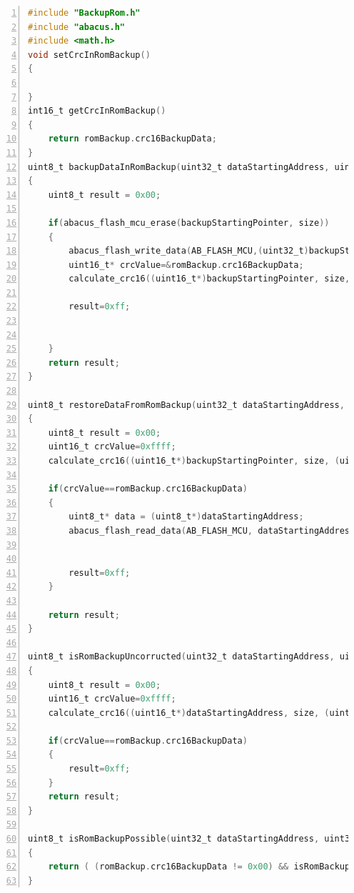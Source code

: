 \documentclass[LaM,binding=0.6cm,oneside]{../sapthesis}
\begin{document}
\begin{lstlisting}[language=C,
                   basicstyle=\scriptsize,
                   numbers=left,
                   stepnumber=0,
                   numbersep=4pt,
                   tabsize=2,
                   showspaces=false,
                   showstringspaces=false]
#include "BackupRom.h"
#include "abacus.h"
#include <math.h>
void setCrcInRomBackup()
{

}
int16_t getCrcInRomBackup()
{
    return romBackup.crc16BackupData;
}
uint8_t backupDataInRomBackup(uint32_t dataStartingAddress, uint32_t backupStartingPointer, uint32_t size)
{
    uint8_t result = 0x00;

    if(abacus_flash_mcu_erase(backupStartingPointer, size))
    {
        abacus_flash_write_data(AB_FLASH_MCU,(uint32_t)backupStartingPointer,(uint8_t*)dataStartingAddress,size);
        uint16_t* crcValue=&romBackup.crc16BackupData;
        calculate_crc16((uint16_t*)backupStartingPointer, size, crcValue, 1);

        result=0xff;


    }
    return result;
}

uint8_t restoreDataFromRomBackup(uint32_t dataStartingAddress, uint32_t backupStartingPointer, uint32_t size)
{
    uint8_t result = 0x00;
    uint16_t crcValue=0xffff;
    calculate_crc16((uint16_t*)backupStartingPointer, size, (uint16_t*)&crcValue, 1);

    if(crcValue==romBackup.crc16BackupData)
    {
        uint8_t* data = (uint8_t*)dataStartingAddress;
        abacus_flash_read_data(AB_FLASH_MCU, dataStartingAddress, data, PERSISTENT_RAM_LENGTH);


        result=0xff;
    }

    return result;
}

uint8_t isRomBackupUncorructed(uint32_t dataStartingAddress, uint32_t size)
{
    uint8_t result = 0x00;
    uint16_t crcValue=0xffff;
    calculate_crc16((uint16_t*)dataStartingAddress, size, (uint16_t*)&crcValue, 1);

    if(crcValue==romBackup.crc16BackupData)
    {
        result=0xff;
    }
    return result;
}

uint8_t isRomBackupPossible(uint32_t dataStartingAddress, uint32_t size)
{
    return ( (romBackup.crc16BackupData != 0x00) && isRomBackupUncorructed(dataStartingAddress,size) );
}

\end{lstlisting}
\end{document}
